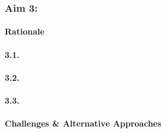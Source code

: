 \subsubsection{Aim 3: \SpecificAimThree}

\paragraph{Rationale}

\lipsum[1-1]

\paragraph{3.1. \SpecificAimThreeA}

\lipsum[2-2]

\paragraph{3.2. \SpecificAimThreeB}

\lipsum[3-3]

\paragraph{3.3. \SpecificAimThreeC}

\lipsum[4-4]

\paragraph{Challenges \& Alternative Approaches}

\lipsum[5-5]
